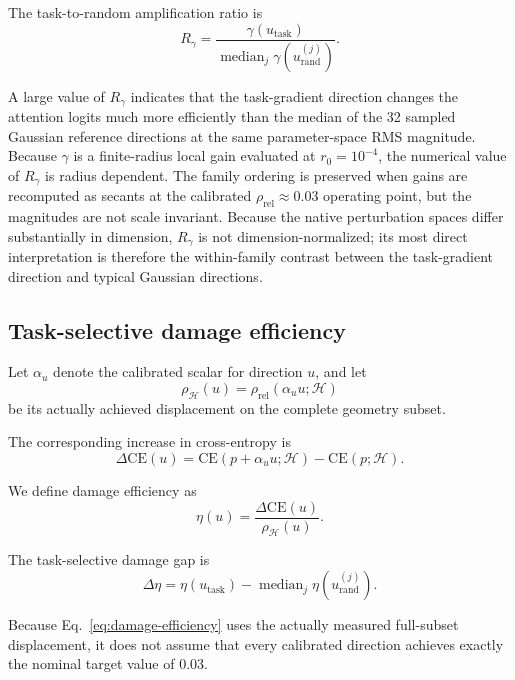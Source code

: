 \documentclass[preprint,12pt,authoryear]{elsarticle}
\begin{document}
The task-to-random amplification ratio is
\begin{equation}
R_{\gamma}
=
\frac{
\gamma(u_{\mathrm{task}})
}{
\operatorname{median}_{j}
\gamma(u_{\mathrm{rand}}^{(j)})
}.
\label{eq:gain-ratio}
\end{equation}

A large value of $R_{\gamma}$ indicates that the task-gradient direction
changes the attention logits much more efficiently than the median of the
32 sampled Gaussian reference directions at the same parameter-space RMS
magnitude. Because $\gamma$ is a finite-radius local gain evaluated at
$r_0=10^{-4}$, the numerical value of $R_{\gamma}$ is radius dependent.
The family ordering is preserved when gains are recomputed as secants at the
calibrated $\rho_{\mathrm{rel}}\approx0.03$ operating point, but the
magnitudes are not scale invariant. Because the native perturbation spaces differ
substantially in dimension, $R_{\gamma}$ is not dimension-normalized; its most
direct interpretation is therefore the within-family contrast between the
task-gradient direction and typical Gaussian directions.


\subsection{Task-selective damage efficiency}

Let $\alpha_u$ denote the calibrated scalar for direction $u$, and let
\[
\rho_{\mathcal{H}}(u)
=
\rho_{\mathrm{rel}}(\alpha_u u;\mathcal{H})
\]
be its actually achieved displacement on the complete geometry subset.

The corresponding increase in cross-entropy is
\begin{equation}
\Delta\mathrm{CE}(u)
=
\mathrm{CE}(p+\alpha_u u;\mathcal{H})
-
\mathrm{CE}(p;\mathcal{H}).
\label{eq:delta-ce}
\end{equation}

We define damage efficiency as
\begin{equation}
\eta(u)
=
\frac{
\Delta\mathrm{CE}(u)
}{
\rho_{\mathcal{H}}(u)
}.
\label{eq:damage-efficiency}
\end{equation}

The task-selective damage gap is
\begin{equation}
\Delta\eta
=
\eta(u_{\mathrm{task}})
-
\operatorname{median}_{j}
\eta(u_{\mathrm{rand}}^{(j)}).
\label{eq:damage-gap}
\end{equation}

Because Eq.~\eqref{eq:damage-efficiency} uses the actually measured
full-subset displacement, it does not assume that every calibrated
direction achieves exactly the nominal target value of 0.03.
\end{document}
